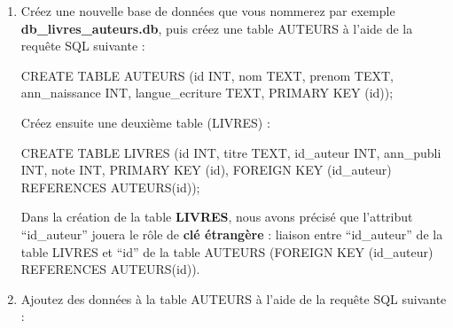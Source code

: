 \documentclass[
  letterpaper,
  DIV=11,
  numbers=noendperiod]{scrartcl}
\newenvironment{Shaded}{\begin{snugshade}}{\end{snugshade}}
\newcommand{\DataTypeTok}[1]{\textcolor[rgb]{0.68,0.00,0.00}{#1}}
\newcommand{\KeywordTok}[1]{\textcolor[rgb]{0.00,0.23,0.31}{#1}}
\newcommand{\NormalTok}[1]{\textcolor[rgb]{0.00,0.23,0.31}{#1}}
\begin{document}
\begin{enumerate}
\def\labelenumi{\arabic{enumi}.}
\item
  Créez une nouvelle base de données que vous nommerez par exemple
  \textbf{db\_livres\_auteurs.db}, puis créez une table AUTEURS à l'aide
  de la requête SQL suivante :

\begin{Shaded}
\begin{Highlighting}[]
\KeywordTok{CREATE} \KeywordTok{TABLE}\NormalTok{ AUTEURS}
\NormalTok{(}\KeywordTok{id} \DataTypeTok{INT}\NormalTok{, nom TEXT, prenom TEXT, ann\_naissance }\DataTypeTok{INT}\NormalTok{, langue\_ecriture TEXT, }\KeywordTok{PRIMARY} \KeywordTok{KEY}\NormalTok{ (}\KeywordTok{id}\NormalTok{));}
\end{Highlighting}
\end{Shaded}

  Créez ensuite une deuxième table (LIVRES) :

\begin{Shaded}
\begin{Highlighting}[]
\KeywordTok{CREATE} \KeywordTok{TABLE}\NormalTok{ LIVRES}
\NormalTok{(}\KeywordTok{id} \DataTypeTok{INT}\NormalTok{, titre TEXT, id\_auteur }\DataTypeTok{INT}\NormalTok{, ann\_publi }\DataTypeTok{INT}\NormalTok{, note }\DataTypeTok{INT}\NormalTok{, }\KeywordTok{PRIMARY} \KeywordTok{KEY}\NormalTok{ (}\KeywordTok{id}\NormalTok{), }\KeywordTok{FOREIGN} \KeywordTok{KEY}\NormalTok{ (id\_auteur) }\KeywordTok{REFERENCES}\NormalTok{ AUTEURS(}\KeywordTok{id}\NormalTok{));}
\end{Highlighting}
\end{Shaded}

  Dans la création de la table \textbf{LIVRES}, nous avons précisé que
  l'attribut ``id\_auteur'' jouera le rôle de \textbf{clé étrangère} :
  liaison entre ``id\_auteur'' de la table LIVRES et ``id'' de la table
  AUTEURS (FOREIGN KEY (id\_auteur) REFERENCES AUTEURS(id)).
\item
  Ajoutez des données à la table AUTEURS à l'aide de la requête SQL
  suivante :


\end{enumerate}
\end{document}
